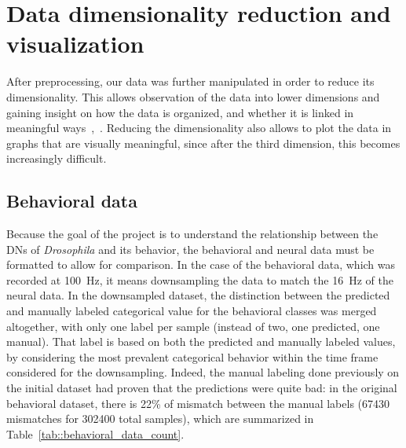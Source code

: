 \section{Data dimensionality reduction and visualization}

After preprocessing, our data was further manipulated in order to reduce its dimensionality.
This allows observation of the data into lower dimensions and gaining insight on how the data is organized, and whether it is linked in meaningful ways~\cite{cunningham2014},~\cite{valletta2017}.
Reducing the dimensionality also allows to plot the data in graphs that are visually meaningful, since after the third dimension, this becomes increasingly difficult.

\subsection{Behavioral data}

Because the goal of the project is to understand the relationship between the DNs of \textit{Drosophila} and its behavior, the behavioral and neural data must be formatted to allow for comparison.
In the case of the behavioral data, which was recorded at \SI{100}{\hertz}, it means downsampling the data to match the \SI{16}{\hertz} of the neural data.
In the downsampled dataset, the distinction between the predicted and manually labeled categorical value for the behavioral classes was merged altogether, with only one label per sample (instead of two, one predicted, one manual).
That label is based on both the predicted and manually labeled values, by considering the most prevalent categorical behavior within the time frame considered for the downsampling.
Indeed, the manual labeling done previously on the initial dataset had proven that the predictions were quite bad: in the original behavioral dataset, there is 22\% of mismatch between the manual labels (67430 mismatches for 302400 total samples), which are summarized in Table~\ref{tab::behavioral_data_count}.

